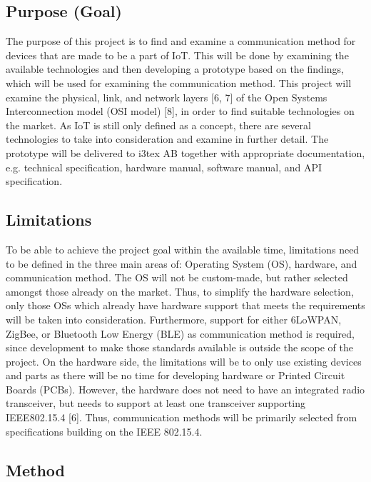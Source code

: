 \subsection{Purpose (Goal)}

The purpose of this project is to find and examine a communication method for devices that are made to be a part of IoT.
This will be done by examining the available technologies and then developing a prototype based on the findings,
	which will be used for examining the communication method.
This project will examine the physical,
	link,
	and network layers [6, 7] of the Open Systems Interconnection model (OSI model) [8],
	in order to find suitable technologies on the market.
As IoT is still only defined as a concept,
	there are several technologies to take into consideration and examine in further detail.
The prototype will be delivered to i3tex AB together with appropriate documentation,
	e.g.
technical specification,
	hardware manual,
	software manual,
	and API specification.

\subsection{Limitations}

To be able to achieve the project goal within the available time,
	limitations need to be defined in the three main areas of:
	Operating System (OS),
	hardware,
	and communication method.
The OS will not be custom-made,
	but rather selected amongst those already on the market.
Thus,
	to simplify the hardware selection,
	only those OSs which already have hardware support that meets the requirements will be taken into consideration.
Furthermore,
	support for either 6LoWPAN,
	ZigBee,
	or Bluetooth Low Energy (BLE) as communication method is required,
	since development to make those standards available is outside the scope of the project.
On the hardware side,
	the limitations will be to only use existing devices and parts as there will be no time for developing hardware or Printed Circuit Boards (PCBs).
However,
	the hardware does not need to have an integrated radio transceiver,
	but needs to support at least one transceiver supporting IEEE802.15.4 [6].
Thus,
	communication methods will be primarily selected from specifications building on the IEEE 802.15.4.

\subsection{Method}

